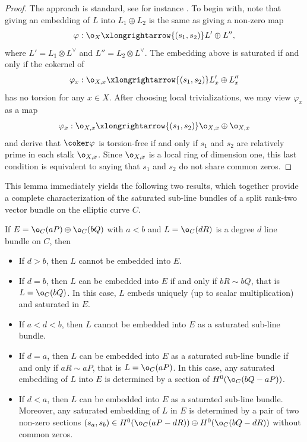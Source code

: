 \documentclass[10pt, leqno]{amsart}
\begin{document}
\begin{proof}
The approach is standard, see for instance \cite[p.~32]{friedman_1998}. To begin with, note that giving an embedding of $L$ into $L_1 \oplus L_2$ is the same as giving a non-zero map
\[
\varphi : \o_X \xlongrightarrow{(s_1, s_2)} L' \oplus L'',
\]
where $L' = L_1 \otimes L^\vee$ and $L'' = L_2 \otimes L^\vee$. The embedding above is saturated if and only if the cokernel of
\[
\varphi_x : \o_{X,x} \xlongrightarrow{(s_1, s_2)} L'_x \oplus L''_x
\]
has no torsion for any $x\in X$. After choosing local trivializations, we may view $\varphi_x$ as a map
\[
\varphi_x : \o_{X,x} \xlongrightarrow{(s_1, s_2)} \o_{X,x} \oplus \o_{X,x}
\]
and derive that $\coker \varphi$ is torsion-free if and only if $s_1$ and $s_2$ are relatively prime in each stalk $\o_{X,x}$. Since $\o_{X,x}$ is a local ring of dimension one, this last condition is equivalent to saying that $s_1$ and $s_2$ do not share common zeros.
\end{proof}

This lemma immediately yields the following two results, which together provide a complete characterization of the saturated sub-line bundles of a split rank-two vector bundle on the elliptic curve $C$.

\begin{cor} \label{cor:saturated_embeddings_a<b}
If $E = \o_C(aP) \oplus \o_C(bQ)$ with $a<b$ and $L = \o_C(dR)$ is a degree $d$ line bundle on $C$, then
\begin{itemize}
    \item [(a)] If $d > b$, then $L$ cannot be embedded into $E$.
    \item [(b)] If $d = b$, then $L$ can be embedded into $E$ if and only if $bR \sim bQ$, that is $L = \o_C(bQ)$. In this case, $L$ embeds uniquely (up to scalar multiplication) and saturated in $E$.
    \item [(c)] If $a < d < b$, then $L$ cannot be embedded into $E$ as a saturated sub-line bundle.
    \item [(d)] If $d = a$, then $L$ can be embedded into $E$ as a saturated sub-line bundle if and only if $aR \sim aP$, that is $L = \o_C(aP)$. In this case, any saturated embedding of $L$ into $E$ is determined by a section of $H^0(\o_C(bQ - aP))$.
    \item [(e)] If $d < a$, then $L$ can be embedded into $E$ as a saturated sub-line bundle. Moreover, any saturated embedding of $L$ in $E$ is determined by a pair of two non-zero sections $(s_a, s_b) \in H^0(\o_C(aP - dR)) \oplus H^0(\o_C(bQ - dR))$ without common zeros. 
\end{itemize}
\end{cor}
\end{document}
